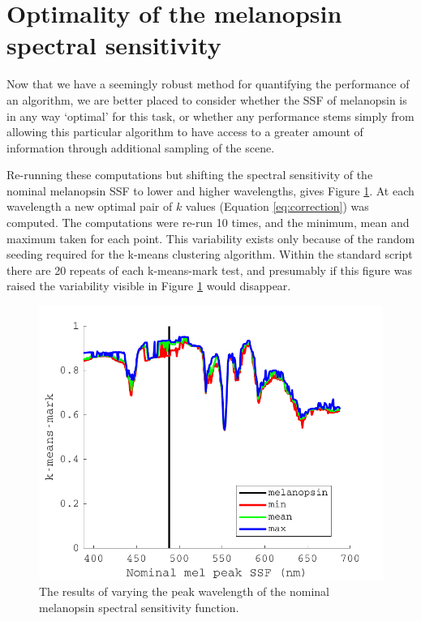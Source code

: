 
\section{Optimality of the melanopsin spectral sensitivity}


Now that we have a seemingly robust method for quantifying the performance of an algorithm, we are better placed to consider whether the \gls{SSF} of melanopsin is in any way `optimal' for this task, or whether any performance stems simply from allowing this particular algorithm to have access to a greater amount of information through additional sampling of the scene.

Re-running these computations but shifting the spectral sensitivity of the nominal melanopsin \gls{SSF} to lower and higher wavelengths, gives Figure \ref{fig:optimality}. At each wavelength a new optimal pair of $k$ values (Equation \ref{eq:correction}) was computed. The computations were re-run 10 times, and the minimum, mean and maximum taken for each point. This variability exists only because of the random seeding required for the k-means clustering algorithm. Within the standard script there are 20 repeats of each k-means-mark test, and presumably if this figure was raised the variability visible in Figure \ref{fig:optimality} would disappear.

\begin{figure}[htbp]
 \includegraphics[max width=\textwidth]{figs/comp/optimality_caller/optimality.pdf}
 \caption{The results of varying the peak wavelength of the nominal melanopsin spectral sensitivity function.}
 \label{fig:optimality}
\end{figure} 

